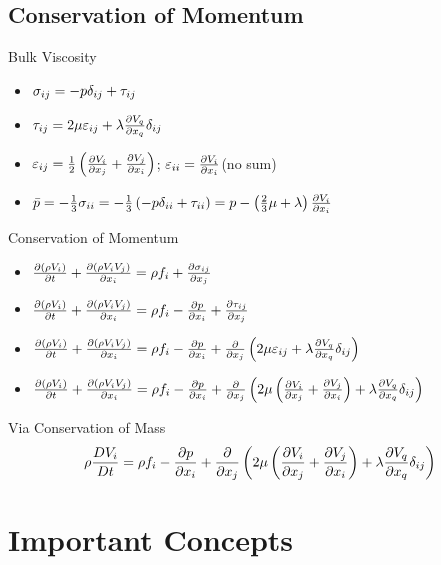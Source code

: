 \documentclass[a4paper]{article}
\begin{document}
    \subsection{Conservation of Momentum}
        Bulk Viscosity
        \begin{itemize} 
        \item $\sigma_{ij} = -p \delta_{ij} + \tau_{ij}$
        \item $\tau_{ij} = 2 \mu \varepsilon_{ij} + \lambda \frac{\partial V_q}{\partial x_q}\delta_{ij}$
        \item $\varepsilon_{ij} = \frac{1}{2}\left( \frac{\partial V_i}{\partial x_j} + \frac{\partial V_j}{\partial x_i} \right)$; $\varepsilon_{ii} = \frac{\partial V_i}{\partial x_i}$(no sum)
        \item $\bar{p} = -\frac{1}{3} \sigma_{ii} = -\frac{1}{3} \left( -p \kdel{ii} + \tau_{ii} \right) = %
        p - \left(\frac{2}{3}\mu  + \lambda \right)\partderiv{V_i}{x_i}$
        \end{itemize}
        Conservation of Momentum
        \begin{itemize}
        \item $\frac{\partial (\rho V_i)}{\partial t} + \frac{\partial (\rho V_i V_j)}{\partial x_i} = \rho f_i + \frac{\partial \sigma_{ij}}{\partial x_j}$ 
        \item $\partderiv{(\rho V_i)}{t} + \partderiv{(\rho V_i V_j)}{x_i} = \rho f_i - %
        \partderiv{p}{x_i} + \partderiv{\tau_{ij}}{x_j}$ 
        \item $\partderiv{(\rho V_i)}{t} + \partderiv{(\rho V_i V_j)}{x_i} = \rho f_i - %
        \partderiv{p}{x_i} + \partderiv{}{x_j} \left(  2 \mu \varepsilon_{ij} + \lambda \partderiv{V_q}{x_q}\kdel{ij} \right)$ 
        \item $\partderiv{(\rho V_i)}{t} + \partderiv{(\rho V_i V_j)}{x_i} = \rho f_i - %
        \partderiv{p}{x_i} + \partderiv{}{x_j} \left(  2 \mu \left( \partderiv{V_i}{x_j} + \partderiv{V_j}{x_i} \right) +%
        \lambda \partderiv{V_q}{x_q}\kdel{ij} \right)$ 
        \end{itemize}
        Via Conservation of Mass
        \begin{equation*}
        \rho \matderiv{V_i}{t} = \rho f_i - %
        \partderiv{p}{x_i} + \partderiv{}{x_j} \left(  2 \mu \left( \partderiv{V_i}{x_j} + \partderiv{V_j}{x_i} \right) +%
        \lambda \partderiv{V_q}{x_q}\kdel{ij} \right)
        \end{equation*}

\section{Important Concepts}
\end{document}
